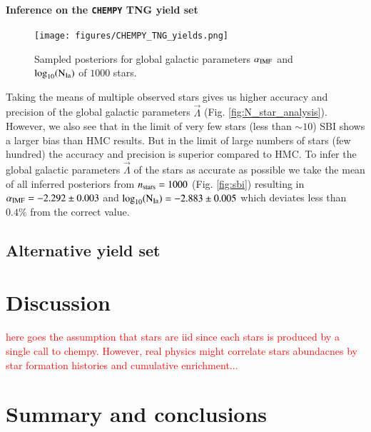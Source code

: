 \documentclass{aa}
\begin{document}
\paragraph{Inference on the \texttt{CHEMPY} TNG yield set}

\begin{figure}
    \centering
    \texttt{[image: figures/CHEMPY\_TNG\_yields.png]}
    \vspace{-.25cm}
    \caption{Sampled posteriors for global galactic parameters $\alpha_{\rm IMF}$ and $\log_{10}(\rm N_{Ia})$ of $1000$ stars.}
    \label{fig:CHEMPY_TNG_sbi} 
\end{figure}

%
Taking the means of multiple observed stars gives us higher accuracy and precision of the global galactic parameters $\vec\Lambda$ (Fig. \ref{fig:N_star_analysis}). However, we also see that in the limit of very few stars (less than $\sim10$) SBI shows a larger bias than HMC results. But in the limit of large numbers of stars (few hundred) the accuracy and precision is superior compared to HMC.
%
To infer the global galactic parameters $\vec\Lambda$ of the stars as accurate as possible we take the mean of all inferred posteriors from $n_{\rm stars}=1000$ (Fig. \ref{fig:sbi}) resulting in $\alpha_{\rm IMF}=-2.292\pm0.003$ and $\log_{10}(\rm N_{Ia})=-2.883\pm0.005$ which deviates less than $0.4\%$ from the correct value.


\subsection{Alternative yield set}
\label{subsec: mocks_wrong_yield}

\section{Discussion}
\label{sec: conclusion}

\textcolor{red}{here goes the assumption that stars are iid since each stars is produced by a single call to chempy. However, real physics might correlate stars abundacnes by star formation histories and cumulative enrichment...}

\section{Summary and conclusions}
\label{sec: conclusion}
\end{document}
